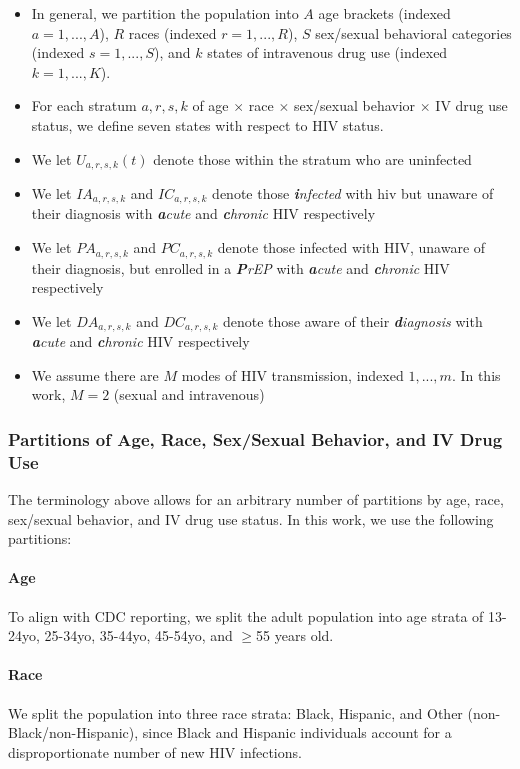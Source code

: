 \documentclass{article}
\begin{document}
\begin{itemize}
	\item In general, we partition the population into $A$ age brackets (indexed $a = 1, ..., A$), $R$ races (indexed $r = 1, ..., R$), $S$ sex/sexual behavioral categories (indexed $s = 1, ..., S$), and $k$ states of intravenous drug use (indexed $k = 1, ..., K$).
	\item For each stratum $a,r,s,k$ of age $\times$ race $\times$ sex/sexual behavior $\times$ IV drug use status, we define seven states with respect to HIV status.
	\item We let $U_{a,r,s,k}(t)$ denote those within the stratum who are uninfected
	\item We let $IA_{a,r,s,k}$ and $IC_{a,r,s,k}$ denote those \textit{\textbf{i}nfected} with hiv but unaware of their diagnosis with \textit{\textbf{a}cute} and \textit{\textbf{c}hronic} HIV respectively
	\item We let $PA_{a,r,s,k}$ and $PC_{a,r,s,k}$ denote those infected with HIV, unaware of their diagnosis, but enrolled in a \textit{\textbf{P}rEP} with \textit{\textbf{a}cute} and \textit{\textbf{c}hronic} HIV respectively
	\item We let $DA_{a,r,s,k}$ and $DC_{a,r,s,k}$ denote those aware of their \textit{\textbf{d}iagnosis} with \textit{\textbf{a}cute} and \textit{\textbf{c}hronic} HIV respectively
	\item We assume there are $M$ modes of HIV transmission, indexed $1, ..., m$. In this work, $M=2$ (sexual and intravenous)
\end{itemize}

\subsubsection{Partitions of Age, Race, Sex/Sexual Behavior, and IV Drug Use}
The terminology above allows for an arbitrary number of partitions by age, race, sex/sexual behavior, and IV drug use status. In this work, we use the following partitions:

\paragraph{Age} To align with CDC reporting, we split the adult population into age strata of 13-24yo, 25-34yo, 35-44yo, 45-54yo, and $\geq$55 years old.

\paragraph{Race} We split the population into three race strata: Black, Hispanic, and Other (non-Black/non-Hispanic), since Black and Hispanic individuals account for a disproportionate number of new HIV infections.
\end{document}
